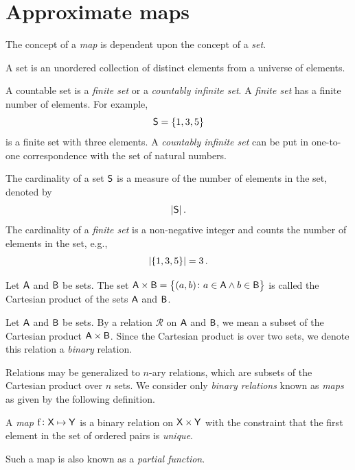 \documentclass[11pt,final,hidelinks]{article}
\begin{document}
\providecommand{\mainx}{..}

\section{Approximate maps}
\label{sec:}
\label{sec:map}
The concept of a \emph{map} is dependent upon the concept of a \emph{set}.
\begin{definition}
	A set is an unordered collection of distinct elements from a universe of elements.
\end{definition}

A countable set is a \emph{finite set} or a \emph{countably infinite set}. A \emph{finite set} has a finite number of elements. For example,
\[
\Set{S} = \{ 1, 3, 5 \}
\]
is a finite set with three elements. A \emph{countably infinite set} can be put in one-to-one correspondence with the set of natural numbers.

The cardinality of a set $\Set{S}$ is a measure of the number of elements in the set, denoted by
\begin{equation}
\Card{\Set{\Set{S}}}\,.
\end{equation}
The cardinality of a \emph{finite set} is a non-negative integer and counts the number of elements in the set, e.g.,
\[
\lvert\left\{ 1, 3, 5\right\}\rvert = 3\,.
\]

\begin{definition}
	Let $\Set{A}$ and $\Set{B}$ be sets. The set $\Set{A} \times \Set{B}= \left\{(a, b) \colon a \in \Set{A} \land b \in \Set{B}\right\}$ is called the Cartesian product of the sets $\Set{A}$ and $\Set{B}$.
\end{definition}

\begin{definition}
	Let $\Set{A}$ and $\Set{B}$ be sets. By a relation $\mathcal{R}$ on $\Set{A}$ and $\Set{B}$, we mean a subset of the Cartesian product $\Set{A} \times \Set{B}$. Since the Cartesian product is over two sets, we denote this relation a \emph{binary} relation.
\end{definition}
Relations may be generalized to $n$-ary relations, which are subsets of the Cartesian product over $n$ sets. We consider only \emph{binary relations} known as \emph{maps} as given by the following definition.
\begin{definition}
	A \emph{map} $\Fun{f} \colon \Set{X} \mapsto \Set{Y}$ is a binary relation on $\Set{X} \times \Set{Y}$ with the constraint that the first element in the set of ordered pairs is \emph{unique}.
\end{definition}
Such a map is also known as a \emph{partial function}.
\end{document}
